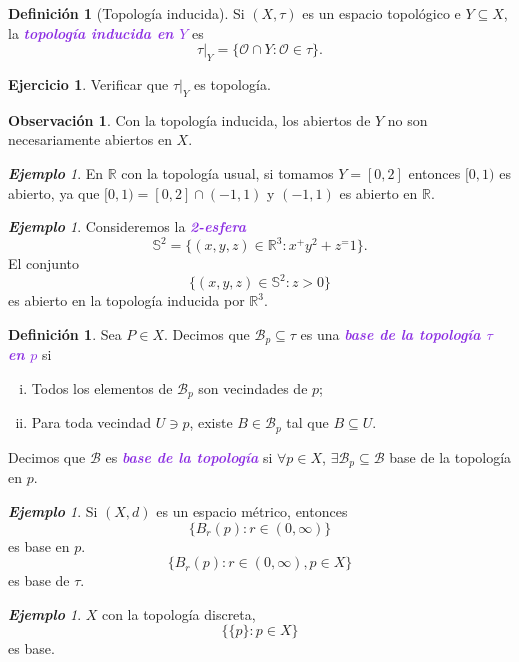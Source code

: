 \documentclass{article}
\theoremstyle{definition}
\newtheorem{definition}[theorem]{Definición}
\newtheorem{exercise}{Ejercicio}
\newtheorem*{obs}{Observación}
\theoremstyle{remark}
\newtheorem{example}[theorem]{\textbf{Ejemplo}}
\numberwithin{equation}{section}
\newcommand{\B}{\mathcal{B}}
\renewcommand{\O}{\mathcal{O}}
\newcommand{\R}{\mathbb{R}}
\renewcommand{\S}{\mathbb{S}}
\renewcommand{\t}{\tau}
\newcommand{\oo}{\infty}
\newcommand{\wea}[1]{\textcolor{BlueViolet}{\textbf{\emph{#1}}}}
\begin{document}
\begin{definition}
  [Topología inducida]
  Si $(X,\t)$ es un espacio topológico e $Y \subseteq X$, la \wea{topología inducida en $Y$} es
  \[\t|_Y = \{\O \cap Y \colon \O \in \t\}.\]
\end{definition}

\begin{exercise}
  Verificar que $\t|_Y$ es topología.
\end{exercise}

\begin{obs}
  Con la topología inducida, los abiertos de $Y$ no son necesariamente abiertos en $X$.
\end{obs}

\begin{example}
  En $\R$ con la topología usual, si tomamos $Y = [0,2]$ entonces $[0,1)$ es abierto, ya que $[0,1) = [0,2] \cap (-1,1)$ y $(-1,1)$ es abierto en $\R$.
\end{example}

\begin{example}
  Consideremos la \wea{2-esfera}
  \[\S^2 = \{(x,y,z) \in \R^3 \colon x^+ y^2 + z^= 1\}.\]
  El conjunto
  \[\{(x,y,z) \in \S^2 \colon z>0\}\]
  es abierto en la topología inducida por $\R^3$.
\end{example}

\begin{definition}
  Sea $P \in X$. Decimos que $\B_p \subseteq \t$ es una \wea{base de la topología $\t$ en $p$} si
  \begin{enumerate}[(i)]
    \item Todos los elementos de $\B_p$ son vecindades de $p$;
    \item Para toda vecindad $U \ni p$, existe $B \in \B_p$ tal que $B \subseteq U$.
  \end{enumerate}
  Decimos que $\B$ es \wea{base de la topología} si $\forall p \in X$, $\exists \B_p \subseteq \B$ base de la topología en $p$.
\end{definition}

\begin{example}
  Si $(X,d)$ es un espacio métrico, entonces
  \[\{B_r(p) \colon r \in (0,\oo)\}\]
  es base en $p$.
  \[\{B_r(p) \colon r \in (0,\oo), p \in X\}\]
  es base de $\t$.
\end{example}

\begin{example}
  $X$ con la topología discreta,
  \[\{\{p\} \colon p \in X\}\]
  es base.
\end{example}
\end{document}
